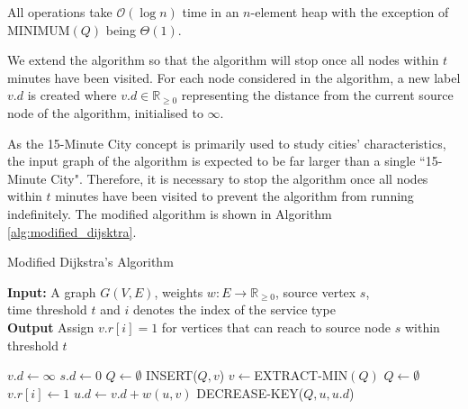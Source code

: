 All operations take $\mathcal{O}(\log n)$ time in an $n$-element heap with the exception of $\text{MINIMUM}(Q)$ being $\Theta(1)$.

We extend the algorithm so that the algorithm will stop once all nodes within $t$ minutes have been visited. For each node considered in the algorithm, a new label $v.d$ is created where $v.d \in \mathbb{R}_{\geq 0}$ representing the distance from the current source node of the algorithm, initialised to $\infty$.

As the 15-Minute City concept is primarily used to study cities' characteristics, the input graph of the algorithm is expected to be far larger than a single ``15-Minute City". Therefore, it is necessary to stop the algorithm once all nodes within $t$ minutes have been visited to prevent the algorithm from running indefinitely. The modified algorithm is shown in Algorithm \ref{alg:modified_dijsktra}.

\begin{algorithm}[H]
    \caption{Modified Dijkstra's Algorithm} \label{alg:modified_dijsktra}
    \textbf{Input:} A graph $G(V,E)$, weights $w:E\rightarrow\mathbb{R}_{\geq 0}$, source vertex $s$, \\  time threshold $t$ and $i$ denotes the index of the service type\\
    \textbf{Output} Assign $v.r[i]=1$ for vertices that can reach to source node $s$ within threshold $t$ %
    \begin{algorithmic}
            \State $v.d\gets\infty$
        \EndFor
        \State $s.d\gets 0$
        \State $Q\gets\emptyset$
            \State INSERT($Q,v$)
        \EndFor
            \State $v\gets$EXTRACT-MIN$(Q)$
                \State $Q\gets\emptyset$ 
            \Else
                \State $v.r[i] \gets 1 $
                        \State $u.d\gets v.d+w(u,v)$
                        \State DECREASE-KEY($Q,u,u.d$)
                    \EndIf
                \EndFor
            \EndIf
        \EndWhile
    \end{algorithmic}
\end{algorithm}


